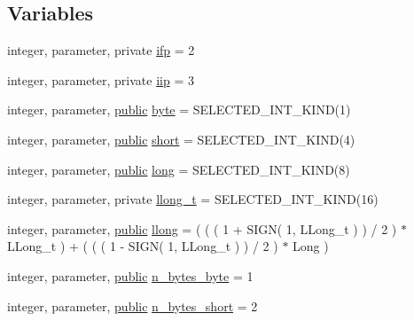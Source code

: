 \subsection*{Variables}
\begin{DoxyCompactItemize}
\item 
integer, parameter, private \hyperlink{namespacem__compare__float__numbers_abdbebb777d8ce2fa018e86724bfdfb9e}{ifp} = 2
\item 
integer, parameter, private \hyperlink{namespacem__compare__float__numbers_a6fab297801aadc3067acefdd136384ad}{iip} = 3
\item 
integer, parameter, \hyperlink{M__stopwatch_83_8txt_a2f74811300c361e53b430611a7d1769f}{public} \hyperlink{namespacem__compare__float__numbers_ae232d1653572b564934db62fc9caaa93}{byte} = S\+E\+L\+E\+C\+T\+E\+D\+\_\+\+I\+N\+T\+\_\+\+K\+I\+ND(1)
\item 
integer, parameter, \hyperlink{M__stopwatch_83_8txt_a2f74811300c361e53b430611a7d1769f}{public} \hyperlink{namespacem__compare__float__numbers_a8afcd039ad8a1e52969e5a5165163b68}{short} = S\+E\+L\+E\+C\+T\+E\+D\+\_\+\+I\+N\+T\+\_\+\+K\+I\+ND(4)
\item 
integer, parameter, \hyperlink{M__stopwatch_83_8txt_a2f74811300c361e53b430611a7d1769f}{public} \hyperlink{namespacem__compare__float__numbers_a1a70f80b01ccf5c63ed3eb70fabdaf2d}{long} = S\+E\+L\+E\+C\+T\+E\+D\+\_\+\+I\+N\+T\+\_\+\+K\+I\+ND(8)
\item 
integer, parameter, private \hyperlink{namespacem__compare__float__numbers_a7c4a2b4cc39888d092d7a754897be9e5}{llong\+\_\+t} = S\+E\+L\+E\+C\+T\+E\+D\+\_\+\+I\+N\+T\+\_\+\+K\+I\+ND(16)
\item 
integer, parameter, \hyperlink{M__stopwatch_83_8txt_a2f74811300c361e53b430611a7d1769f}{public} \hyperlink{namespacem__compare__float__numbers_a9c3da9dd020c03b19ee8acf1dafdce20}{llong} = ( ( ( 1 + S\+I\+GN( 1, L\+Long\+\_\+t ) ) / 2 ) $\ast$ L\+Long\+\_\+t ) + ( ( ( 1 -\/ S\+I\+GN( 1, L\+Long\+\_\+t ) ) / 2 ) $\ast$ Long )
\item 
integer, parameter, \hyperlink{M__stopwatch_83_8txt_a2f74811300c361e53b430611a7d1769f}{public} \hyperlink{namespacem__compare__float__numbers_a5faf0176b9b713e8d12ede8294da171d}{n\+\_\+bytes\+\_\+byte} = 1
\item 
integer, parameter, \hyperlink{M__stopwatch_83_8txt_a2f74811300c361e53b430611a7d1769f}{public} \hyperlink{namespacem__compare__float__numbers_acff1ac867eea95e76e28f083be5bddcc}{n\+\_\+bytes\+\_\+short} = 2
\item 

\end{DoxyCompactItemize}
